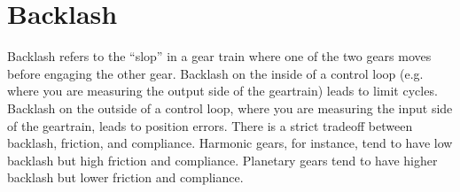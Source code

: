 \documentclass[]{article}
\newcommand{\gear}[3]{%
  \def\modu{#1}
  \def\Zb{#2}
  \def\AngleA{#3}

  \pgfmathsetmacro{\Rpr}{\Zb*\modu/2}
  \pgfmathsetmacro{\Rb}{\Rpr*cos(\AngleA)}
  \pgfmathsetmacro{\Rt}{\Rpr+\modu}
  \pgfmathsetmacro{\Rp}{\Rpr-1.25*\modu}
  \pgfmathsetmacro{\AngleT}{pi/180*acos(\Rb/\Rt)}
  \pgfmathsetmacro{\AnglePr}{pi/180*acos(\Rb/\Rpr)}
  \pgfmathsetmacro{\demiAngle}{180/\Zb}
  \pgfmathsetmacro{\Angledecal}{(\demiAngle-2*\AnglePr)/2}

  \foreach \zz in{1,2,...,\Zb}{
    \draw
    ({(\zz))/\Zb*360-\Angledecal}:\Rb)
    -- (\zz/\Zb*360-\Angledecal:\Rp)
    to[bend right=\demiAngle]
    (\zz/\Zb*360+\Angledecal:\Rp)
    --
    plot[domain=-0:\AngleT,smooth,variable=\t]
    ({{180/pi*(-\t+tan(180/pi*\t)) +\zz/\Zb*360+\Angledecal}:\Rb/cos(180/pi*\t)})
    to[bend right=\demiAngle]
    ({{180/pi*(\AngleT+tan(180/pi*-\AngleT)) +(\zz+1)/\Zb*360-\Angledecal}:
      \Rb/cos(180/pi*-\AngleT)})
    plot[domain=-\AngleT:-0,smooth,variable=\t]
    ({{180/pi*(-\t+tan(180/pi*\t)) +(\zz+1)/\Zb*360-\Angledecal}:\Rb/cos(180/pi*\t)});
  }
}
\begin{document}
\section{Backlash}
Backlash refers to the ``slop'' in a gear train where one of the two gears moves before engaging the other gear. Backlash on the inside of a control loop (e.g. where you are measuring the output side of the geartrain) leads to limit cycles. Backlash on the outside of a control loop, where you are measuring the input side of the geartrain, leads to position errors. There is a strict tradeoff between backlash, friction, and compliance. Harmonic gears, for instance, tend to have low backlash but high friction and compliance. Planetary gears tend to have higher backlash but lower friction and compliance.
\begin{figure}[h!]\centering
{}
\end{figure}
\end{document}
